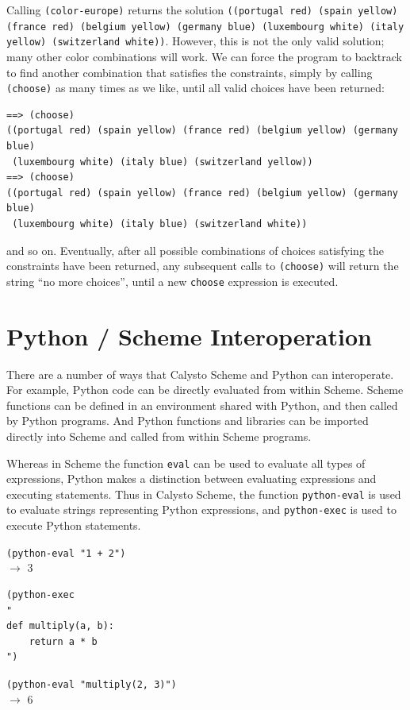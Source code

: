 \documentclass[acmsmall,screen,authorversion]{acmart}
\begin{document}
\noindent
Calling \texttt{(color-europe)} returns the solution \texttt{((portugal red)
(spain yellow) (france red) (belgium yellow) (germany blue) (luxembourg
white) (italy yellow) (switzerland white))}. However, this is not the only
valid solution; many other color combinations will work.  We can force the
program to backtrack to find another combination that satisfies the
constraints, simply by calling \texttt{(choose)} as many times as we like,
until all valid choices have been returned:

{\small
\begin{verbatim}
==> (choose)
((portugal red) (spain yellow) (france red) (belgium yellow) (germany blue)
 (luxembourg white) (italy blue) (switzerland yellow))
==> (choose)
((portugal red) (spain yellow) (france red) (belgium yellow) (germany blue)
 (luxembourg white) (italy blue) (switzerland white))
\end{verbatim}
}

\noindent
and so on.  Eventually, after all possible combinations of choices satisfying
the constraints have been returned, any subsequent calls to \texttt{(choose)}
will return the string ``no more choices'', until a new \texttt{choose}
expression is executed.

\section{Python / Scheme Interoperation}

There are a number of ways that Calysto Scheme and Python can interoperate. For
example, Python code can be directly evaluated from within Scheme. Scheme
functions can be defined in an environment shared with Python, and then called
by Python programs. And Python functions and libraries can be imported directly
into Scheme and called from within Scheme programs.

Whereas in Scheme the function \texttt{eval} can be used to evaluate all types
of expressions, Python makes a distinction between evaluating expressions and
executing statements. Thus in Calysto Scheme, the function \texttt{python-eval} is
used to evaluate strings representing Python expressions, and
\texttt{python-exec} is used to execute Python statements.\\

{\small
\noindent
\texttt{(python-eval "1 + 2")}\\
$\rightarrow$ 3

\noindent
\begin{verbatim}
(python-exec
"
def multiply(a, b):
    return a * b
")
\end{verbatim}
\noindent\texttt{(python-eval "multiply(2, 3)")}\\
$\rightarrow$ 6\\
}
\end{document}
